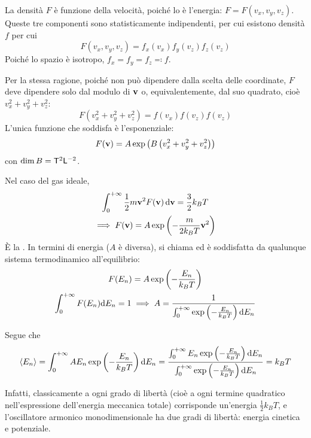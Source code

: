 La densità $F$ è funzione della velocità, poiché lo è l'energia: $F = F(v_x, v_y, v_z)$.
Queste tre componenti sono statisticamente indipendenti, per cui esistono densità $f$ per cui
\begin{equation}
    F(v_x, v_y, v_z) = f_x(v_x) f_y(v_z) f_z(v_z)
\end{equation}
Poiché lo spazio è isotropo, $f_x = f_y = f_z \eqcolon f$.

Per la stessa ragione, poiché non può dipendere dalla scelta delle coordinate, $F$ deve dipendere solo dal modulo di $\mathbf{v}$ o, equivalentemente, dal suo quadrato, cioè $v_x^2 + v_y^2 + v_z^2$:
\begin{equation}
    F(v_x^2 + v_y^2 + v_z^2) = f(v_x) f(v_z) f(v_z)
\end{equation}
L'unica funzione che soddisfa è l'esponenziale:
\begin{equation}
    F(\mathbf{v}) = A \operatorname{exp}\left( B \left( v_x^2 + v_y^2 + v_z^2 \right) \right)
\end{equation}
con $\operatorname{dim}{B} = \mathsf{T}^2 \mathsf{L}^{-2}$.

Nel caso del gas ideale,
\begin{gather}
    \int_0^{+\infty} \frac{1}{2} m \mathbf{v}^2 F(\mathbf{v}) \, \mathrm{d} \mathbf{v} = \frac{3}{2} k_B T \\
    \implies F(\mathbf{v}) = A \operatorname{exp}\left( -\frac{m}{2 k_B T} \mathbf{v}^2 \right)
\end{gather}
È la .
In termini di energia ($A$ è diversa), si chiama  ed è soddisfatta da qualunque sistema termodinamico all'equilibrio:
\begin{gather}
    F({E_n}) = A \operatorname{exp}\left( -\frac{{E_n}}{k_B T} \right) \\
    \int_0^{+\infty} F({E_n}) \mathrm{d} {E_n} = 1
    \implies A = \frac{1}{\int_0^{+\infty} \operatorname{exp}\left( -\frac{{E_n}}{k_B T} \right) \mathrm{d} {E_n}}
\end{gather}

Segue che
\begin{equation}
    \left\langle {E_n} \right\rangle = \int_0^{+\infty} A {E_n} \operatorname{exp}\left( -\frac{{E_n}}{k_B T} \right) \mathrm{d} {E_n}
    = \frac{\int_0^{+\infty} {E_n} \operatorname{exp}\left( -\frac{{E_n}}{k_B T} \right) \mathrm{d} {E_n}}{\int_0^{+\infty} \operatorname{exp}\left( -\frac{{E_n}}{k_B T} \right) \mathrm{d} {E_n}}
    = k_B T
\end{equation}

Infatti, classicamente a ogni grado di libertà (cioè a ogni termine quadratico nell'espressione dell'energia meccanica totale) corrisponde un'energia $\frac{1}{2} k_B T$, e l'oscillatore armonico monodimensionale ha due gradi di libertà: energia cinetica e potenziale.

